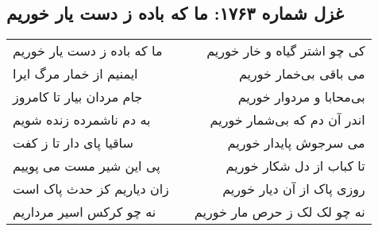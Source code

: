 \begin{center}
\section*{غزل شماره ۱۷۶۳: ما که باده ز دست یار خوریم}
\label{sec:1763}
\begin{longtable}{l p{0.5cm} r}
ما که باده ز دست یار خوریم
&&
کی چو اشتر گیاه و خار خوریم
\\
ایمنیم از خمار مرگ ایرا
&&
می باقی بی‌خمار خوریم
\\
جام مردان بیار تا کامروز
&&
بی‌محابا و مردوار خوریم
\\
به دم ناشمرده زنده شویم
&&
اندر آن دم که بی‌شمار خوریم
\\
ساقیا پای دار تا ز کفت
&&
می سرجوش پایدار خوریم
\\
پی این شیر مست می پوییم
&&
تا کباب از دل شکار خوریم
\\
زان دیاریم کز حدث پاک است
&&
روزی پاک از آن دیار خوریم
\\
نه چو کرکس اسیر مرداریم
&&
نه چو لک لک ز حرص مار خوریم
\\
\end{longtable}
\end{center}
